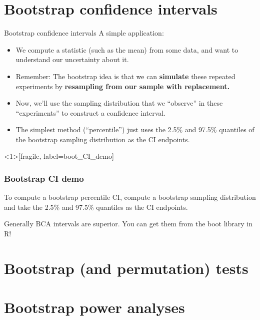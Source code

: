 \documentclass{beamer} %
\begin{document}
\section{Bootstrap confidence intervals}

\begin{frame}{Bootstrap confidence intervals}
A simple application:
\begin{itemize}[<+(1)->] \itemsep 1em
\item We compute a statistic (such as the mean) from some data, and want to understand our uncertainty about it.
\item Remember: The bootstrap idea is that we can \textbf{simulate} these repeated experiments by \textbf{resampling from our sample with replacement.}
\item Now, we'll use the sampling distribution that we ``observe'' in these ``experiments'' to construct a confidence interval.
\item The simplest method (``percentile'') just uses the 2.5\% and 97.5\% quantiles of the bootstrap sampling distribution as the CI endpoints.
\end{itemize}
\end{frame}

\begin{frame}<1>[fragile, label=boot_CI_demo]
\frametitle{Bootstrap CI demo}
\begin{figure}
\centering
{}
\end{figure}
\end{frame}

\begin{frame}[standout]
To compute a bootstrap percentile CI, compute a bootstrap sampling distribution and take the 2.5\% and 97.5\% quantiles as the CI endpoints.
\end{frame}


\begin{frame}[standout]
Generally BCA intervals are superior. You can get them from the boot library in R!
\end{frame}




\section{Bootstrap (and permutation) tests}

\section{Bootstrap power analyses}
\end{document}
